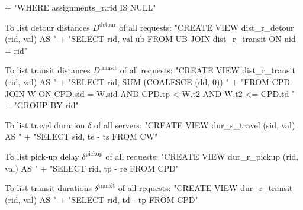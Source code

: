 \documentclass{article}
\def\nwendcode{\endtrivlist \endgroup}      %
\let\nwdocspar=\par
\theoremstyle{definition}                   %
\begin{document}
  + "WHERE assignments_r.rid IS NULL"
\nwendcode{}\nwdocspar
To list detour distances $D^\textrm{detour}$ of all requests:
\nwenddocs{}\endmoddef{}
"CREATE VIEW dist_r_detour (rid, val) AS "
  + "SELECT rid, val-ub FROM UB JOIN dist_r_transit ON uid = rid"
\nwendcode{}\nwdocspar
To list transit distances $D^\textrm{transit}$ of all requests:
\nwenddocs{}\endmoddef{}
"CREATE VIEW dist_r_transit (rid, val) AS "
  + "SELECT rid, SUM (COALESCE (dd, 0)) "
  + "FROM CPD JOIN W ON CPD.sid = W.sid AND CPD.tp < W.t2 AND W.t2 <= CPD.td "
  + "GROUP BY rid"
\nwendcode{}\nwdocspar
To list travel duration $\delta$ of all servers:
\nwenddocs{}\endmoddef{}
"CREATE VIEW dur_s_travel (sid, val) AS "
  + "SELECT sid, te - ts FROM CW"
\nwendcode{}\nwdocspar
To list pick-up delay $\delta^\textrm{pickup}$ of all requests:
\nwenddocs{}\endmoddef{}
"CREATE VIEW dur_r_pickup (rid, val) AS "
  + "SELECT rid, tp - re FROM CPD"
\nwendcode{}\nwdocspar
To list transit durations $\delta^\textrm{transit}$ of all requests:
\nwenddocs{}\endmoddef{}
"CREATE VIEW dur_r_transit (rid, val) AS "
  + "SELECT rid, td - tp FROM CPD"
\end{document}
